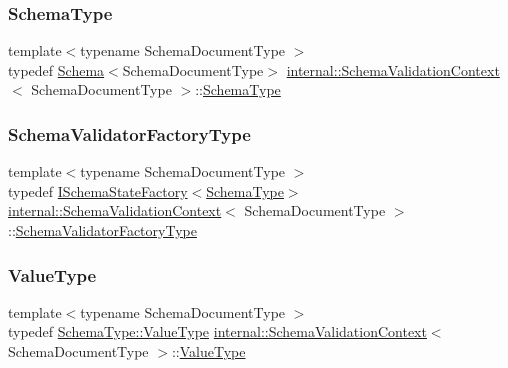 \subsubsection{\texorpdfstring{Schema\+Type}{SchemaType}}
{\footnotesize\ttfamily template$<$typename Schema\+Document\+Type $>$ \\
typedef \hyperlink{classinternal_1_1Schema}{Schema}$<$Schema\+Document\+Type$>$ \hyperlink{structinternal_1_1SchemaValidationContext}{internal\+::\+Schema\+Validation\+Context}$<$ Schema\+Document\+Type $>$\+::\hyperlink{structinternal_1_1SchemaValidationContext_a79b155ab3711b97b6e33ced450614397}{Schema\+Type}}

\mbox{\label{structinternal_1_1SchemaValidationContext_a33fa91fd8e880d1adb9b891fe441f110}} 
\subsubsection{\texorpdfstring{Schema\+Validator\+Factory\+Type}{SchemaValidatorFactoryType}}
{\footnotesize\ttfamily template$<$typename Schema\+Document\+Type $>$ \\
typedef \hyperlink{classinternal_1_1ISchemaStateFactory}{I\+Schema\+State\+Factory}$<$\hyperlink{structinternal_1_1SchemaValidationContext_a79b155ab3711b97b6e33ced450614397}{Schema\+Type}$>$ \hyperlink{structinternal_1_1SchemaValidationContext}{internal\+::\+Schema\+Validation\+Context}$<$ Schema\+Document\+Type $>$\+::\hyperlink{structinternal_1_1SchemaValidationContext_a33fa91fd8e880d1adb9b891fe441f110}{Schema\+Validator\+Factory\+Type}}

\mbox{\label{structinternal_1_1SchemaValidationContext_acc134e808d3a4dbe8834eb1a3e98e816}} 
\subsubsection{\texorpdfstring{Value\+Type}{ValueType}}
{\footnotesize\ttfamily template$<$typename Schema\+Document\+Type $>$ \\
typedef \hyperlink{classinternal_1_1Schema_a8976b6d7e2a885483d0b51d941019340}{Schema\+Type\+::\+Value\+Type} \hyperlink{structinternal_1_1SchemaValidationContext}{internal\+::\+Schema\+Validation\+Context}$<$ Schema\+Document\+Type $>$\+::\hyperlink{structinternal_1_1SchemaValidationContext_acc134e808d3a4dbe8834eb1a3e98e816}{Value\+Type}}



